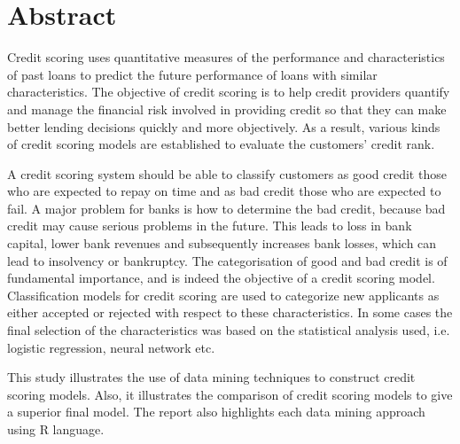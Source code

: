 \documentclass{article}\usepackage[]{graphicx}\usepackage[]{color}
\begin{document}





\section{Abstract}
\hspace{0.5cm} Credit scoring uses quantitative measures of the performance and characteristics of past loans to predict the future performance of loans with similar characteristics. The objective of credit scoring is to help credit providers quantify and manage the financial risk involved in providing credit so that they can make better lending decisions quickly and more objectively. As a result, various kinds of credit scoring models are established to evaluate the customers' credit rank.
\par A credit scoring system should be able to classify customers as good credit those  who are expected to repay on time and as bad credit those who are expected to fail. A major problem for banks is how to determine the bad credit, because bad credit may cause serious problems in the future. This leads to loss in bank capital, lower bank revenues and subsequently increases bank losses, which can lead to insolvency or bankruptcy. The categorisation of good and bad credit is of fundamental importance, and is indeed the objective of a credit scoring model. Classification models for credit scoring are used to categorize new applicants as either accepted or rejected with respect to these characteristics. In some cases the final selection of the characteristics was based on the statistical analysis used, i.e. logistic regression, neural network etc.
\par This study illustrates the use of data mining techniques to construct credit scoring models. Also, it illustrates the comparison of credit scoring models to give a superior final model. The report also highlights each data mining approach using R language.\\
\end{document}
